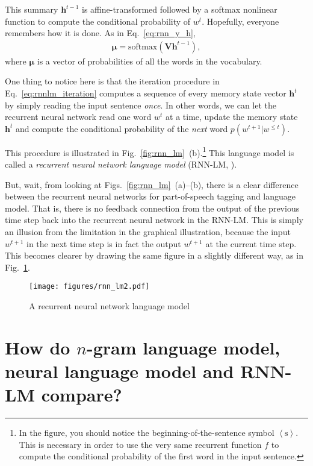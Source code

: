 \documentclass{report}
\newcommand{\softmax}{\text{softmax}}
\newcommand{\vect}[1]{\mathbf{#1}}
\newcommand{\vects}[1]{\boldsymbol{#1}}
\newcommand{\matr}[1]{\mathbf{#1}}
\newcommand{\vh}[0]{\vect{h}}
\newcommand{\mV}[0]{\matr{V}}
\newcommand{\vmu}[0]{\vects{\mu}}
\begin{document}
This summary $\vh^{t-1}$ is affine-transformed followed by a softmax nonlinear
function to compute the conditional probability of $w^t$. Hopefully, everyone
remembers how it is done. As in Eq.~\eqref{eq:rnn_y_h}, 
\begin{align*}
    \vmu = \softmax(\mV \vh^{t-1}),
\end{align*}
where $\vmu$ is a vector of probabilities of all the words in the vocabulary.

One thing to notice here is that the iteration procedure in
Eq.~\eqref{eq:rnnlm_iteration} computes a sequence of every memory state vector
$\vh^t$ by simply reading the input sentence {\em once}. In other words, we can
let the recurrent neural network read one word $w^t$ at a time, update the
memory state $\vh^t$ and compute the conditional probability of the {\em next}
word $p(w^{t+1}|w^{\leq t})$. 

This procedure is illustrated in Fig.~\ref{fig:rnn_lm}~(b).\footnote{
    In the figure, you should notice the beginning-of-the-sentence symbol
    $\left< \text{s} \right>$. This is necessary in order to use the very same
    recurrent function $f$ to compute the conditional probability of the first
    word in the input sentence.
}
This language model is called a {\em recurrent neural network language
model} (RNN-LM, \cite{mikolov2010recurrent}). 

But, wait, from looking at Figs.~\ref{fig:rnn_lm}~(a)--(b), there is a clear
difference between the recurrent neural networks for part-of-speech tagging and
language model. That is, there is no feedback connection from the output of the
previous time step back into the recurrent neural network in the RNN-LM.  This
is simply an illusion from the limitation in the graphical illustration, because
the input $w^{t+1}$ in the next time step is in fact the output $w^{t+1}$ at the
current time step. This becomes clearer by drawing the same figure in a slightly
different way, as in Fig.~\ref{fig:rnn_lm2}.

\begin{figure}[t]
    \centering
    \texttt{[image: figures/rnn\_lm2.pdf]}

    \caption{
        A recurrent neural network language model
    }
    \label{fig:rnn_lm2}
\end{figure}

\section{How do $n$-gram language model, neural language model and RNN-LM
compare?}
\end{document}
